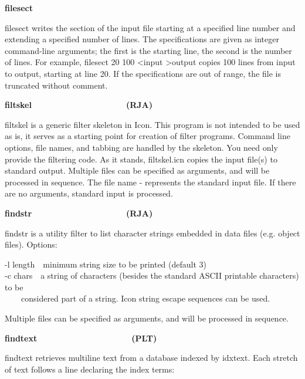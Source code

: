 {{\sffamily\bfseries
filesect\ \ \ \ \ \ \ \ \ \ \ \ \ \ \ \ \ \ \ \ }

\textsf{filesect} writes the section of the input file starting at a
specified line number and extending a specified number of lines. The
specifications are given as integer command-line arguments; the first
is the starting line, the second is the number of lines. For example,
\textsf{filesect 20 100 {\textless}input {\textgreater}output} copies
100 lines from input to output, starting at line 20. If the
specifications are out of range, the file is truncated without comment.

{\sffamily\bfseries
filtskel\ \ \ \ \ \ \ \ \ \ \ \ \ \ \ \ \ \ \ \ (RJA)}

\textsf{filtskel} is a generic filter skeleton in Icon. This program is
not intended to be used as is, it serves as a starting point for
creation of filter programs. Command line options, file names, and
tabbing are handled by the skeleton. You need only provide the
filtering code. As it stands, \textsf{filtskel.icn} copies the input
file(s) to standard output. Multiple files can be specified as
arguments, and will be processed in sequence. The file name
\textsf{{\textquotedbl}-{\textquotedbl}} represents the standard input
file. If there are no arguments, standard input is processed.

{\sffamily\bfseries
findstr\ \ \ \ \ \ \ \ \ \ \ \ \ \ \ \ \ \ \ \ (RJA)}

\textsf{findstr} is a utility filter to list character strings embedded
in data files (e.g. object files). Options:

\textsf{{}-l length}\ \ minimum string size to be printed (default
3)\\
\textsf{{}-c chars}\ \ a string of characters (besides the standard
ASCII printable characters) to be\\
\ \ \ \ considered part of a string. Icon string escape sequences can be
used.

Multiple files can be specified as arguments, and will be processed in
sequence. 

{\sffamily\bfseries
findtext\ \ \ \ \ \ \ \ \ \ \ \ \ \ \ \ \ \ \ \ (PLT)}

\textsf{findtext} retrieves multiline text from a
database indexed by idxtext. Each stretch of text
follows a line declaring the index terms:



}

